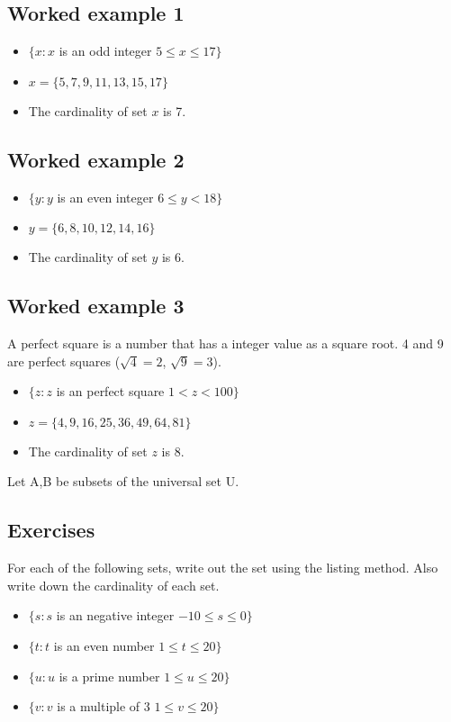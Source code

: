 \documentclass[a4paper,12pt]{article}
\begin{document}
\subsection*{Worked example 1}
\begin{itemize}
\item $\{ x : x $ is an odd integer $ 5 \leq x \leq 17 \}$
\item $x = \{5,7,9,11,13,15,17\}$
\item The cardinality of set $x$ is 7.
\end{itemize}

\subsection*{Worked example 2}
\begin{itemize}
\item $\{ y : y $ is an even integer $ 6 \leq y < 18 \}$
\item $y = \{6,8,10,12,14,16\}$
\item The cardinality of set $y$ is 6.
\end{itemize}

\subsection*{Worked example 3}
A perfect square is a number that has a integer value as a
square root. 4 and 9 are perfect squares ($\sqrt{4} = 2$,
$\sqrt{9} = 3$).
\begin{itemize}
\item $\{ z : z $ is an perfect square $ 1 < z < 100 \}$
\item $z = \{4,9,16,25,36,49,64,81\}$
\item The cardinality of set $z$ is 8.
\end{itemize}
\item Let A,B be subsets of the universal set U.

\newpage

\subsection*{Exercises}
For each of the following sets, write out the set using the listing method.
Also write down the cardinality of each set.

\begin{itemize} 
\item $\{ s : s $ is an negative integer $ -10 \leq s \leq 0 \}$
\item $\{ t : t $ is an even number $ 1 \leq t \leq 20 \}$
\item $\{ u : u $ is a prime number $ 1 \leq u \leq 20 \}$
\item $\{ v : v $ is a multiple of 3 $ 1 \leq v \leq 20 \}$
\end{itemize}
\newpage
\end{document}
